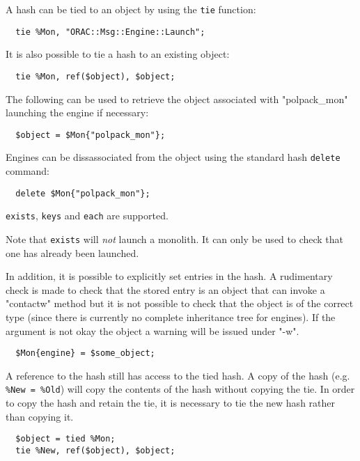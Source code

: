 A hash can be tied to an object by using the \texttt{tie} function:

\begin{verbatim}
  tie %Mon, "ORAC::Msg::Engine::Launch";
\end{verbatim}


It is also possible to tie a hash to an existing object:

\begin{verbatim}
  tie %Mon, ref($object), $object;
\end{verbatim}


The following can be used to retrieve the object associated with
"polpack\_mon" launching the engine if necessary:

\begin{verbatim}
  $object = $Mon{"polpack_mon"};
\end{verbatim}


Engines can be dissassociated from the object using the
standard hash \texttt{delete} command:

\begin{verbatim}
  delete $Mon{"polpack_mon"};
\end{verbatim}


\texttt{exists}, \texttt{keys} and \texttt{each} are supported.



Note that \texttt{exists} will \textit{not} launch a monolith. It can only
be used to check that one has already been launched.



In addition, it is possible to explicitly set entries in the hash. A
rudimentary check is made to check that the stored entry is an object
that can invoke a "contactw" method but it is not possible to check
that the object is of the correct type (since there is currently no
complete inheritance tree for engines). If the argument is not okay
the object a warning will be issued under "-w".

\begin{verbatim}
  $Mon{engine} = $some_object;
\end{verbatim}


A reference to the hash still has access to the tied hash.  A copy of
the hash (e.g. \texttt{\%New = \%Old}) will copy the contents of the hash
without copying the tie.  In order to copy the hash and retain the
tie, it is necessary to tie the new hash rather than copying it.

\begin{verbatim}
  $object = tied %Mon;
  tie %New, ref($object), $object;
\end{verbatim}

